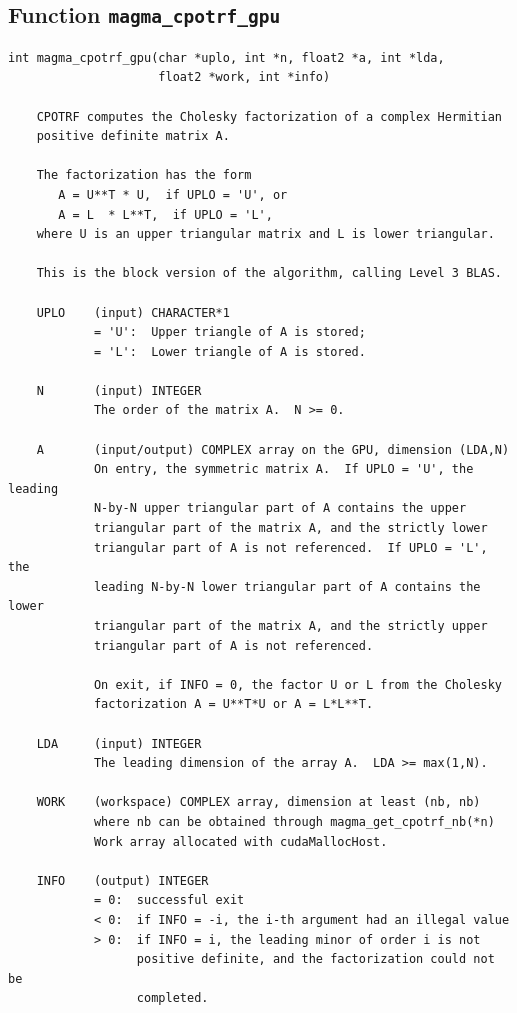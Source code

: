 \documentclass[10pt]{book}
\begin{document}
\subsection{Function {\tt {\bf magma\_cpotrf\_gpu}}}
\begin{verbatim}
int magma_cpotrf_gpu(char *uplo, int *n, float2 *a, int *lda, 
                     float2 *work, int *info)
   
    CPOTRF computes the Cholesky factorization of a complex Hermitian   
    positive definite matrix A.   

    The factorization has the form   
       A = U**T * U,  if UPLO = 'U', or   
       A = L  * L**T,  if UPLO = 'L',   
    where U is an upper triangular matrix and L is lower triangular.   

    This is the block version of the algorithm, calling Level 3 BLAS.   

    UPLO    (input) CHARACTER*1   
            = 'U':  Upper triangle of A is stored;   
            = 'L':  Lower triangle of A is stored.   

    N       (input) INTEGER   
            The order of the matrix A.  N >= 0.   

    A       (input/output) COMPLEX array on the GPU, dimension (LDA,N)   
            On entry, the symmetric matrix A.  If UPLO = 'U', the leading   
            N-by-N upper triangular part of A contains the upper   
            triangular part of the matrix A, and the strictly lower   
            triangular part of A is not referenced.  If UPLO = 'L', the   
            leading N-by-N lower triangular part of A contains the lower   
            triangular part of the matrix A, and the strictly upper   
            triangular part of A is not referenced.   

            On exit, if INFO = 0, the factor U or L from the Cholesky   
            factorization A = U**T*U or A = L*L**T.   

    LDA     (input) INTEGER   
            The leading dimension of the array A.  LDA >= max(1,N).   

    WORK    (workspace) COMPLEX array, dimension at least (nb, nb)
            where nb can be obtained through magma_get_cpotrf_nb(*n)
            Work array allocated with cudaMallocHost.

    INFO    (output) INTEGER   
            = 0:  successful exit   
            < 0:  if INFO = -i, the i-th argument had an illegal value   
            > 0:  if INFO = i, the leading minor of order i is not   
                  positive definite, and the factorization could not be   
                  completed.   
\end{verbatim}
\end{document}
